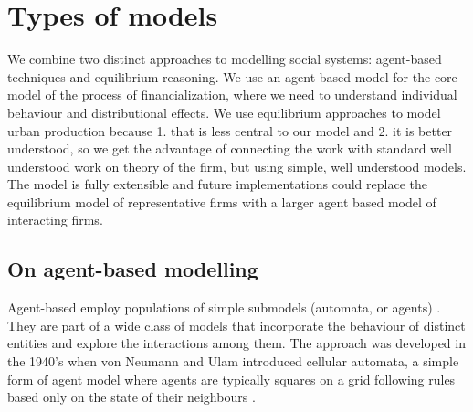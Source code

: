 



\section{Types of models}\label{sec-types}
We combine two distinct approaches to modelling social systems: agent-based techniques and equilibrium reasoning. We use an agent based model for the core model of the process of financialization, where we need to understand individual behaviour and distributional effects. We use equilibrium approaches to model urban production because 1. that is less central to our model and 2. it is better understood, so we get the advantage of connecting the work with standard well understood work on theory of the firm, but using simple, well understood models. The model is fully extensible and future implementations could replace the equilibrium model of representative firms with a larger agent based model of interacting firms.

\subsection{On agent-based modelling}
Agent-based employ populations of simple submodels (automata, or agents) \cite{shalizi_methods_2006}. They are part of a wide class of models that incorporate the behaviour of distinct entities and explore the interactions among them. The approach was developed in the 1940's when von Neumann and Ulam introduced cellular automata, a simple form of agent model where agents are typically squares on a grid following rules based only on the state of their neighbours \cite{banksStatisticalChallengesAgentBased2021}.

